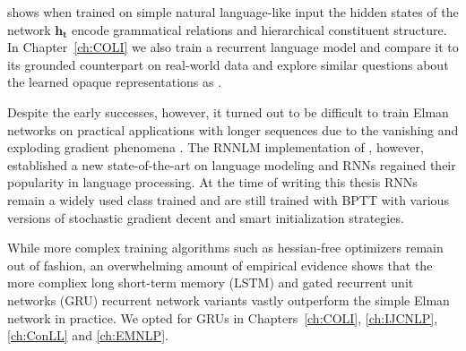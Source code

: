 \cite{elman1991distributed} shows when trained on simple natural language-like input the
hidden states of the network $\mathbf{h_t}$ encode grammatical relations and hierarchical
constituent structure. In Chapter~\ref{ch:COLI} we also train a recurrent language model
and compare it to its grounded counterpart
on real-world data and explore similar questions about the learned opaque representations
as \cite{elman1991distributed} .

Despite the early successes, however, it turned out to be difficult to train
Elman networks on practical applications with longer sequences
due to the vanishing and exploding gradient phenomena \citep{bengio1994learning}.
The RNNLM implementation of \cite{mikolov2010recurrent}, however,
established a new state-of-the-art on language modeling and RNNs regained their popularity
in language processing.  At the time of writing this thesis RNNs remain a widely used class
trained and are still trained with BPTT with various versions of stochastic gradient decent and smart initialization
strategies. 

While more complex training algorithms such as hessian-free optimizers
\citep{martens2011learning} remain out of fashion,
an overwhelming amount of empirical evidence
shows that the more compliex long short-term
memory (LSTM) \citep{hochreiter1997long,gers1999learning}
and gated recurrent unit networks (GRU) \citep{cho2014learning}  recurrent network variants
vastly outperform the simple Elman network in practice. We opted for GRUs in
Chapters~\ref{ch:COLI}, \ref{ch:IJCNLP}, \ref{ch:ConLL} and \ref{ch:EMNLP}.






